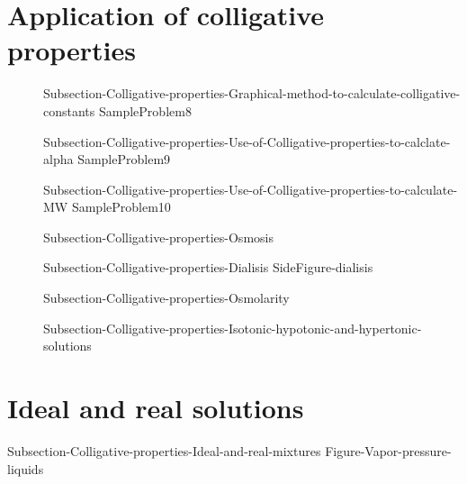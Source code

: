 \documentclass[main.tex]{subfiles}
\newcommand\chapterlabel{Ch-solutions}\setcounter{figurenewcounter}{0}\setcounter{tablenewcounter}{0}\setcounter{formulanewcounter}{0}\chapterpicture{../{\chapterlabel}/figure1}\chapterpicturelabel{PxFuel}
\begin{document}
\section{Application of colligative properties} 
\sloppy \begin{description}
\item[] {Subsection-Colligative-properties-Graphical-method-to-calculate-colligative-constants}
{SampleProblem8}
\item[] {Subsection-Colligative-properties-Use-of-Colligative-properties-to-calclate-alpha}
{SampleProblem9}
\item[] {Subsection-Colligative-properties-Use-of-Colligative-properties-to-calculate-MW}
{SampleProblem10}
\item[] {Subsection-Colligative-properties-Osmosis}
\item[] {Subsection-Colligative-properties-Dialisis}
{SideFigure-dialisis}
\item[] {Subsection-Colligative-properties-Osmolarity}
\item[] {Subsection-Colligative-properties-Isotonic-hypotonic-and-hypertonic-solutions}
\end{description}

\section{Ideal and real solutions} 
{Subsection-Colligative-properties-Ideal-and-real-mixtures}
{Figure-Vapor-pressure-liquids}
 
\end{document}
